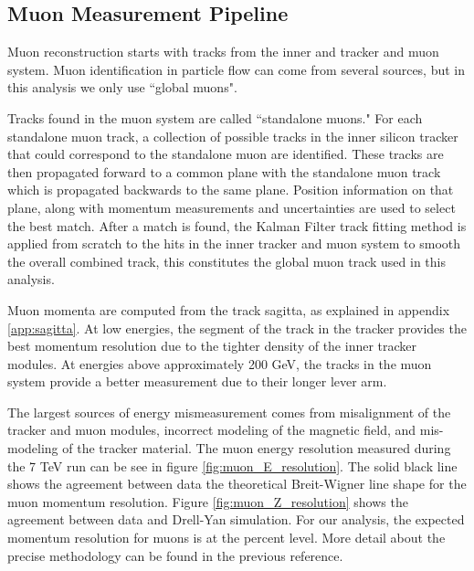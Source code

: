  \subsection{Muon Measurement Pipeline} \label{sec:muon_measurement_pipeline}
    Muon reconstruction starts with tracks from the inner and tracker and muon system. Muon identification in particle flow can come from several sources, but in this analysis we only use ``global muons". 

    Tracks found in the muon system are called ``standalone muons." For each standalone muon track, a collection of possible tracks in the inner silicon tracker that could correspond to the standalone muon are identified. These tracks are then propagated forward to a common plane with the standalone muon track which is propagated backwards to the same plane. Position information on that plane, along with momentum measurements and uncertainties are used to select the best match. \cite[sec 3]{cms_muons} \cite[sec 5.1]{muon_reco_AN} After a match is found, the Kalman Filter track fitting method is applied from scratch to the hits in the inner tracker and muon system to smooth the overall combined track, this constitutes the global muon track used in this analysis.

    Muon momenta are computed from the track sagitta, as explained in appendix \ref{app:sagitta}. At low energies, the segment of the track in the tracker provides the best momentum resolution due to the tighter density of the inner tracker modules. At energies above approximately 200 GeV, the tracks in the muon system provide a better measurement due to their longer lever arm. 

    The largest sources of energy mismeasurement comes from misalignment of the tracker and muon modules, incorrect modeling of the magnetic field, and mis-modeling of the tracker material.\cite[sec. 6]{cms_muons} The muon energy resolution measured during the 7 TeV run can be see in figure \ref{fig:muon_E_resolution}. The solid black line shows the agreement between data the theoretical Breit-Wigner line shape for the muon momentum resolution. Figure \ref{fig:muon_Z_resolution} shows the agreement between data and Drell-Yan simulation. For our analysis, the expected momentum resolution for muons is at the percent level. More detail about the precise methodology can be found in the previous reference.

